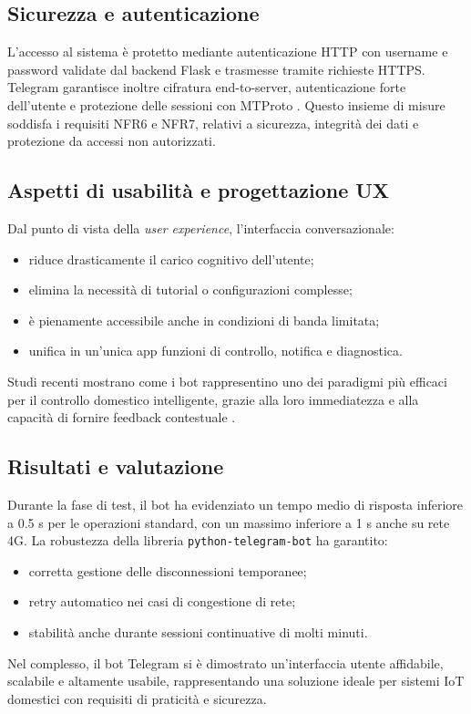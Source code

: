 \subsection*{Sicurezza e autenticazione}
L'accesso al sistema è protetto mediante autenticazione HTTP con username e password validate dal backend Flask e trasmesse tramite richieste HTTPS. Telegram garantisce inoltre cifratura end-to-server, autenticazione forte dell'utente e protezione delle sessioni con MTProto \cite{Kuznetsov2018}. Questo insieme di misure soddisfa i requisiti NFR6 e NFR7, relativi a sicurezza, integrità dei dati e protezione da accessi non autorizzati.

\subsection*{Aspetti di usabilità e progettazione UX}
Dal punto di vista della \textit{user experience}, l'interfaccia conversazionale:
\begin{itemize}
    \item riduce drasticamente il carico cognitivo dell'utente;
    \item elimina la necessità di tutorial o configurazioni complesse;
    \item è pienamente accessibile anche in condizioni di banda limitata;
    \item unifica in un'unica app funzioni di controllo, notifica e diagnostica.
\end{itemize}
Studi recenti mostrano come i bot rappresentino uno dei paradigmi più efficaci per il controllo domestico intelligente, grazie alla loro immediatezza e alla capacità di fornire feedback contestuale \cite{Schiavone2021}.

\subsection*{Risultati e valutazione}
Durante la fase di test, il bot ha evidenziato un tempo medio di risposta inferiore a 0.5 s per le operazioni standard, con un massimo inferiore a 1 s anche su rete 4G. La robustezza della libreria \texttt{python-telegram-bot} ha garantito:
\begin{itemize}
    \item corretta gestione delle disconnessioni temporanee;
    \item retry automatico nei casi di congestione di rete;
    \item stabilità anche durante sessioni continuative di molti minuti.
\end{itemize}
Nel complesso, il bot Telegram si è dimostrato un'interfaccia utente affidabile, scalabile e altamente usabile, rappresentando una soluzione ideale per sistemi IoT domestici con requisiti di praticità e sicurezza.




